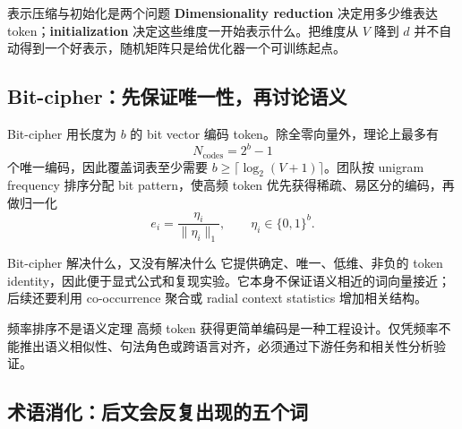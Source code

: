 
\begin{importantbox}{表示压缩与初始化是两个问题}
\textbf{Dimensionality reduction} 决定用多少维表达 token；\textbf{initialization} 决定这些维度一开始表示什么。把维度从 $V$ 降到 $d$ 并不自动得到一个好表示，随机矩阵只是给优化器一个可训练起点。
\end{importantbox}


\subsection{Bit-cipher：先保证唯一性，再讨论语义}

Bit-cipher 用长度为 $b$ 的 bit vector 编码 token。除全零向量外，理论上最多有
\[
N_{\text{codes}}=2^b-1
\]
个唯一编码，因此覆盖词表至少需要 $b\ge \lceil\log_2(V+1)\rceil$。团队按 unigram frequency 排序分配 bit pattern，使高频 token 优先获得稀疏、易区分的编码，再做归一化
\[
e_i=\frac{\eta_i}{\|\eta_i\|_1},\qquad \eta_i\in\{0,1\}^{b}.
\]


\begin{knowledgebox}{Bit-cipher 解决什么，又没有解决什么}
它提供确定、唯一、低维、非负的 token identity，因此便于显式公式和复现实验。它本身不保证语义相近的词向量接近；后续还要利用 co-occurrence 聚合或 radial context statistics 增加相关结构。
\end{knowledgebox}

\begin{warningbox}{频率排序不是语义定理}
高频 token 获得更简单编码是一种工程设计。仅凭频率不能推出语义相似性、句法角色或跨语言对齐，必须通过下游任务和相关性分析验证。
\end{warningbox}


\subsection{术语消化：后文会反复出现的五个词}

